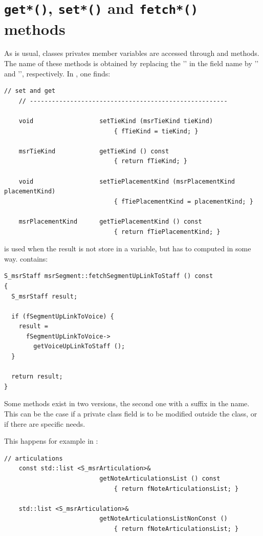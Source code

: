 \section{{\tt get*()}, {\tt set*()} and {\tt fetch*()} methods}

As is usual, classes privates member variables are accessed through  and  methods. The name of these methods is obtained by replacing the '' in the field name by '' and '', respectively. In , one finds:
\begin{lstlisting}[language=CPlusPlus]
    // set and get
    // ------------------------------------------------------

    void                  setTieKind (msrTieKind tieKind)
                              { fTieKind = tieKind; }

    msrTieKind            getTieKind () const
                              { return fTieKind; }

    void                  setTiePlacementKind (msrPlacementKind placementKind)
                              { fTiePlacementKind = placementKind; }

    msrPlacementKind      getTiePlacementKind () const
                              { return fTiePlacementKind; }
\end{lstlisting}


 is used when the result is not store in a variable, but has to computed in some way.  contains:
\begin{lstlisting}[language=CPlusPlus]
S_msrStaff msrSegment::fetchSegmentUpLinkToStaff () const
{
  S_msrStaff result;

  if (fSegmentUpLinkToVoice) {
    result =
      fSegmentUpLinkToVoice->
        getVoiceUpLinkToStaff ();
  }

  return result;
}
\end{lstlisting}

Some methods exist in two versions, the second one with a  suffix in the name. This can be the case if a private class   field is to be modified outside the class, or if there are specific needs.

This happens for example in :
\begin{lstlisting}[language=CPlusPlus]
    // articulations
    const std::list <S_msrArticulation>&
                          getNoteArticulationsList () const
                              { return fNoteArticulationsList; }

    std::list <S_msrArticulation>&
                          getNoteArticulationsListNonConst ()
                              { return fNoteArticulationsList; }
\end{lstlisting}

